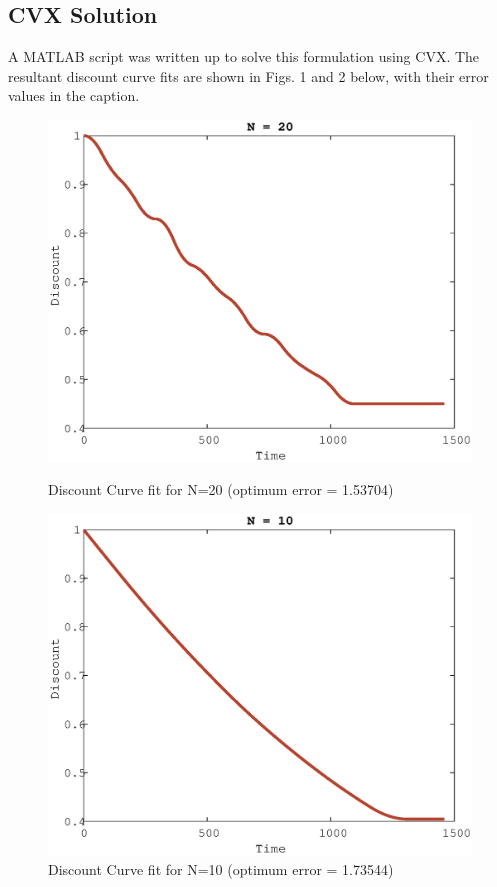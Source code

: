 \documentclass[a4paper]{article}
\begin{document}
\subsection{CVX Solution}
A MATLAB script was written up to solve this formulation using CVX.
The resultant discount curve fits are shown in Figs. 1 and 2 below, with their error values in the caption.

\begin{figure}[!ht]
  \centering
  \begin{minipage}[b]{0.4\textwidth}
    \includegraphics[width=1.0\textwidth]{N20.eps}
    \caption{Discount Curve fit for N=20 (optimum error = 1.53704)}
  \end{minipage}
  \hfill
  \begin{minipage}[b]{0.4\textwidth}
    \includegraphics[width=1.0\textwidth]{N10.eps}
    \caption{Discount Curve fit for N=10 (optimum error = 1.73544)}
  \end{minipage}
\end{figure}
\end{document}
